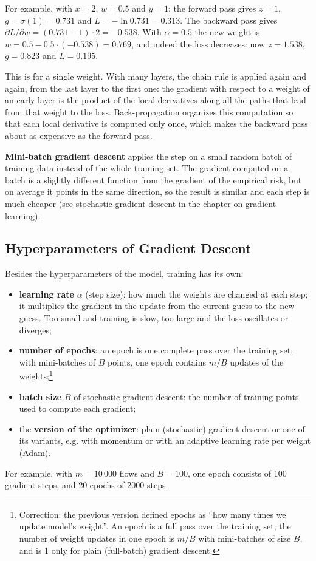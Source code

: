 For example, with $x = 2$, $w = 0.5$ and $y = 1$: the forward pass gives $z = 1$, $g = \sigma(1) = 0.731$ and $L = -\ln 0.731 = 0.313$. The backward pass gives $\partial L/\partial w = (0.731 - 1) \cdot 2 = -0.538$. With $\alpha = 0.5$ the new weight is $w = 0.5 - 0.5 \cdot (-0.538) = 0.769$, and indeed the loss decreases: now $z = 1.538$, $g = 0.823$ and $L = 0.195$.

This is for a single weight. With many layers, the chain rule is applied again and again, from the last layer to the first one: the gradient with respect to a weight of an early layer is the product of the local derivatives along all the paths that lead from that weight to the loss. Back-propagation organizes this computation so that each local derivative is computed only once, which makes the backward pass about as expensive as the forward pass.

\textbf{Mini-batch gradient descent} applies the step on a small random batch of training data instead of the whole training set. The gradient computed on a batch is a slightly different function from the gradient of the empirical risk, but on average it points in the same direction, so the result is similar and each step is much cheaper (see stochastic gradient descent in the chapter on gradient learning).

\subsection{Hyperparameters of Gradient Descent}
Besides the hyperparameters of the model, training has its own:
\begin{itemize}
    \item \textbf{learning rate} $\alpha$ (step size): how much the weights are changed at each step; it multiplies the gradient in the update from the current guess to the new guess. Too small and training is slow, too large and the loss oscillates or diverges;
    \item \textbf{number of epochs}: an epoch is one complete pass over the training set; with mini-batches of $B$ points, one epoch contains $m/B$ updates of the weights;\footnote{Correction: the previous version defined epochs as ``how many times we update model's weight''. An epoch is a full pass over the training set; the number of weight updates in one epoch is $m/B$ with mini-batches of size $B$, and is 1 only for plain (full-batch) gradient descent.}
    \item \textbf{batch size} $B$ of stochastic gradient descent: the number of training points used to compute each gradient;
    \item the \textbf{version of the optimizer}: plain (stochastic) gradient descent or one of its variants, e.g. with momentum or with an adaptive learning rate per weight (Adam).
\end{itemize}
For example, with $m = 10\,000$ flows and $B = 100$, one epoch consists of 100 gradient steps, and 20 epochs of 2000 steps.

